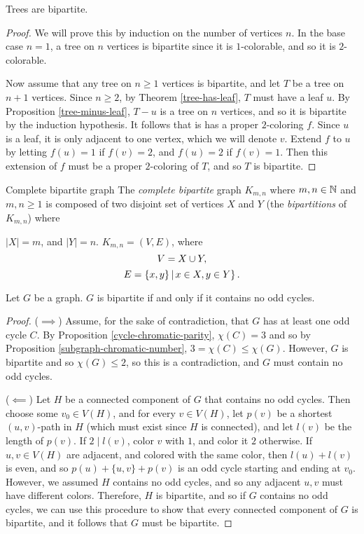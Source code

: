 \begin{prop}
    Trees are bipartite.
\end{prop}

\begin{proof}
    We will prove this by induction on the number of vertices $n$. In the base case $n=1$, a tree on $n$ vertices is bipartite since it is $1$-colorable, and so it is $2$-colorable.

    Now assume that any tree on $n \geq 1$ vertices is bipartite, and let $T$ be a tree on $n+1$ vertices. Since $n \geq 2$, by Theorem \ref{tree-has-leaf}, $T$ must have a leaf $u$. By Proposition \ref{tree-minus-leaf}, $T - u$ is a tree on $n$ vertices, and so it is bipartite by the induction hypothesis. It follows that is has a proper $2$-coloring $f$. Since $u$ is a leaf, it is only adjacent to one vertex, which we will denote $v$. Extend $f$ to $u$ by letting $f(u) = 1$ if $f(v) = 2$, and $f(u) = 2$ if $f(v) = 1$. Then this extension of $f$ must be a proper $2$-coloring of $T$, and so $T$ is bipartite.
\end{proof}

\begin{defn}Complete bipartite graph\proofbreak
    The \emph{complete bipartite} graph $K_{m,n}$ where $m,n \in \mathbb{N}$ and $m,n \geq 1$ is composed of two disjoint set of vertices $X$ and $Y$ (the \emph{bipartitions} of $K_{m,n}$) where \item $|X| = m$, and $|Y| = n$. $K_{m,n} = (V, E)$, where
    \[V = X \cup Y,\]
    \[E = \left\{x, y\} \,\middle|\, x \in X, y \in Y \right\}.\]
\end{defn}

\begin{thm}
    Let $G$ be a graph. $G$ is bipartite if and only if it contains no odd cycles.
\end{thm}

\begin{proof}\proofbreak
    ($\implies$) Assume, for the sake of contradiction, that $G$ has at least one odd cycle $C$. By Proposition \ref{cycle-chromatic-parity}, $\chi(C) = 3$ and so by Proposition \ref{subgraph-chromatic-number}, $3 = \chi(C) \leq \chi(G)$. However, $G$ is bipartite and so $\chi(G) \leq 2$, so this is a contradiction, and $G$ must contain no odd cycles.

    ($\impliedby$) Let $H$ be a connected component of $G$ that contains no odd cycles. Then choose some $v_0 \in V(H)$, and for every $v \in V(H)$, let $p(v)$ be a shortest $(u,v)$-path in $H$ (which must exist since $H$ is connected), and let $l(v)$ be the length of $p(v)$. If $2 \mid l(v)$, color $v$ with $1$, and color it $2$ otherwise. If $u, v \in V(H)$ are adjacent, and colored with the same color, then $l(u) + l(v)$ is even, and so $p(u) + \{u, v\} + p(v)$ is an odd cycle starting and ending at $v_0$. However, we assumed $H$ contains no odd cycles, and so any adjacent $u,v$ must have different colors. Therefore, $H$ is bipartite, and so if $G$ contains no odd cycles, we can use this procedure to show that every connected component of $G$ is bipartite, and it follows that $G$ must be bipartite.
\end{proof}

